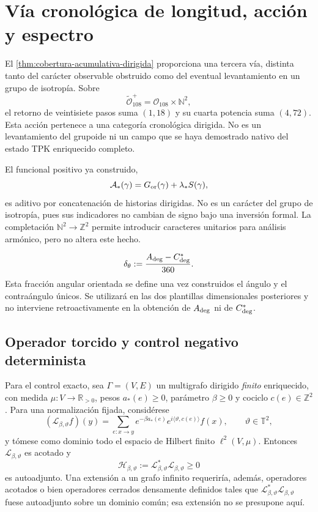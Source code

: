 \section{Vía cronológica de longitud, acción y espectro}
\label{sec:via-cronologica-espectral-G}

El \cref{thm:cobertura-acumulativa-dirigida} proporciona una tercera vía,
distinta tanto del carácter observable obstruido como del eventual
levantamiento en un grupo de isotropía. Sobre
\[
 \widetilde{\mathcal O}_{108}^{+}
 =\mathcal O_{108}\times\mathbb N^2,
\]
el retorno de veintisiete pasos suma \((1,18)\) y su cuarta potencia suma
\((4,72)\). Esta acción pertenece a una categoría cronológica dirigida. No es
un levantamiento del grupoide ni un campo que se haya demostrado nativo del
estado TPK enriquecido completo.

El funcional positivo ya construido,
\[
 \mathcal A_\ast(\gamma)
 =G_{\rm or}(\gamma)+\lambda_\ast S(\gamma),
\]
es aditivo por concatenación de historias dirigidas. No es un carácter del
grupo de isotropía, pues sus indicadores no cambian de signo bajo una
inversión formal. La completación
\(\mathbb N^2\to\mathbb Z^2\) permite introducir caracteres unitarios para
análisis armónico, pero no altera este hecho.

\begin{equation}
\label{eq:fraccion-angular-orientada-G}
 \delta_\theta
 :=\frac{A_{\rm deg}-C_{\rm deg}^{\ast}}{360}.
\end{equation}
Esta fracción angular orientada se define una vez construidos el ángulo y el
contraángulo únicos. Se utilizará en las dos plantillas dimensionales
posteriores y no interviene retroactivamente en la obtención de
\(A_{\rm deg}\) ni de \(C_{\rm deg}^{\ast}\).

\subsection{Operador torcido y control negativo determinista}

Para el control exacto, sea \(\Gamma=(V,E)\) un multigrafo dirigido
\emph{finito} enriquecido, con medida
\(\mu:V\to\mathbb R_{>0}\), pesos \(a_\ast(e)\geq0\), parámetro
\(\beta\geq0\) y cociclo
\(c(e)\in\mathbb Z^2\). Para una normalización fijada, considérese
\[
 (\mathcal L_{\beta,\vartheta}f)(y)
 =
 \sum_{e:x\to y}
 e^{-\beta a_\ast(e)}
 e^{i\langle\vartheta,c(e)\rangle}f(x),
 \qquad
 \vartheta\in\mathbb T^2,
\]
y tómese como dominio todo el espacio de Hilbert finito
\(\ell^2(V,\mu)\). Entonces \(\mathcal L_{\beta,\vartheta}\) es acotado y
\[
 \mathcal H_{\beta,\vartheta}
 :=\mathcal L_{\beta,\vartheta}^{*}
   \mathcal L_{\beta,\vartheta}\geq0
\]
es autoadjunto. Una extensión a un grafo infinito requeriría, además,
operadores acotados o bien operadores cerrados densamente definidos tales
que \(\mathcal L_{\beta,\vartheta}^{*}
\mathcal L_{\beta,\vartheta}\) fuese autoadjunto sobre un dominio común;
esa extensión no se presupone aquí.

